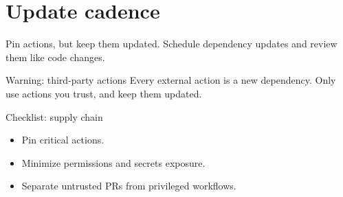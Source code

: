 \section{Update cadence}
Pin actions, but keep them updated.
Schedule dependency updates and review them like code changes.

\begin{warningbox}{Warning: third-party actions}
Every external action is a new dependency.
Only use actions you trust, and keep them updated.
\end{warningbox}

\begin{checklistbox}{Checklist: supply chain}
\begin{itemize}[nosep]
  \item Pin critical actions.
  \item Minimize permissions and secrets exposure.
  \item Separate untrusted PRs from privileged workflows.
\end{itemize}
\end{checklistbox}
